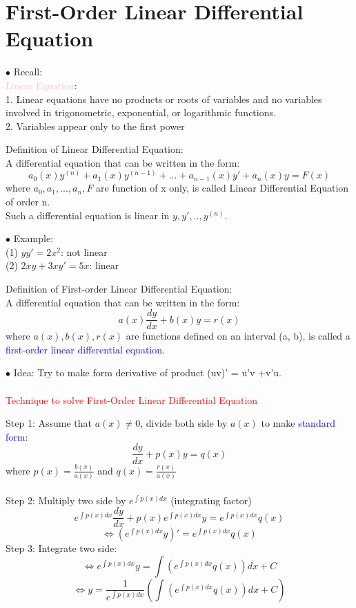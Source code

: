 \documentclass[12pt]{article}
\begin{document}
\section{First-Order Linear Differential Equation }
$\bullet$ Recall: \\
\textcolor{pink}{Linear Equation}: \\
1.  Linear equations have no products or roots of variables and
 no variables involved in trigonometric, exponential, or logarithmic functions.
\\
2. Variables appear only to the first power \\
\begin{mybox}
    Definition of Linear Differential Equation: \\
    A differential equation that can be written in the form:
    $$a_0(x)y^{(n)} + a_1(x)y^{(n-1)}+...+a_{n-1}(x)y'+ a_n(x)y= F(x)$$
    where $a_0,a_1,...,a_n,F$ are function of x only, is called Linear Differential Equation of order n. \\
    Such a differential equation is linear in $y,y',..,y^{(n)}$. 
\end{mybox}
$\bullet$ Example: \\
(1) $yy' = 2x^2$: not linear \\
(2) $2xy + 3xy' = 5x$: linear\\
\newpage
\begin{mybox}
    Definition of First-order Linear Differential Equation: \\
    A differential equation that can be written in the form:
    $$a(x)\frac{dy}{dx} +b(x)y =r(x)$$
    where $a(x),b(x),r(x)$  are functions defined on an interval (a, b), is called a \textcolor{blue}{ first-order linear differential equation}.
\end{mybox}
$\bullet$ Idea: Try to make form derivative of product (uv)' = u'v +v'u. \\
\\
\textcolor{red}{Technique to solve First-Order Linear Differential Equation}

\begin{mybox}
    Step 1: Assume that $a(x) \neq 0$, divide both side by $a(x)$ to make \textcolor{blue}{standard form}: 
    $$ \frac{dy}{dx} +p(x)y = q(x)$$
    where $p(x) = \frac{b(x)}{a(x)}$ and $q(x) = \frac{r(x)}{a(x)}$\\
    \\
    Step 2: Multiply two side by $e^{ \int p(x)dx}$ (integrating factor) \\
    $$e^{ \int p(x)dx} \frac{dy}{dx} +p(x)e^{ \int p(x)dx}y = e^{\int p(x)dx}q(x)$$
   $$\Leftrightarrow (e^{ \int p(x)dx} y)' = e^{ \int p(x)dx}q(x) $$
   Step 3: Integrate two side: \\
   $$\Leftrightarrow e^{ \int p(x)dx} y = \int{(e^{ \int p(x)dx}q(x) )dx} + C $$
   $$\Leftrightarrow y = \frac{1}{e^{ \int p(x)dx}} (\int{(e^{ \int p(x)dx}q(x))dx} + C) $$
\end{mybox}
\end{document}
